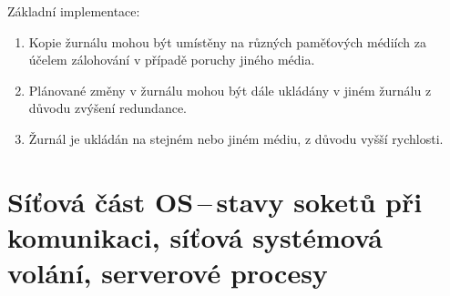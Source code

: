 Základní implementace:

\begin{enumerate}
    \item Kopie žurnálu mohou být umístěny na různých paměťových médiích za účelem zálohování v případě poruchy jiného média.
    \item Plánované změny v žurnálu mohou být dále ukládány v jiném žurnálu z důvodu zvýšení redundance.
    \item Žurnál je ukládán na stejném nebo jiném médiu, z důvodu vyšší rychlosti. 
\end{enumerate}

\newpage
\section{Síťová část OS\,--\,stavy soketů při komunikaci, síťová systémová volání, serverové procesy}
